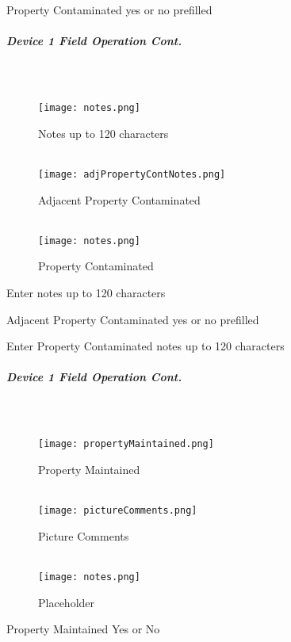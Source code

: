 \documentclass[class=article , crop=false, titlepage, twoside, multi={itemize, figure, verbatim}, float=false]{standalone}
\begin{document}
\noindent Property Contaminated yes or no prefilled\\

\clearpage
\subparagraph*{Device 1 Field Operation Cont.}
\subparagraph*{\\}
\begin{wrapfigure}{r}{0.5\textwidth}
\centering
\texttt{[image: notes.png]}
\caption {Notes up to 120 characters}
\vspace{.2in}
\HRule \\[.4cm] %
\vspace{.2in}
\texttt{[image: adjPropertyContNotes.png]}
\caption{Adjacent Property Contaminated}
\vspace{.2in}
\HRule \\[.4cm] %
\vspace{.2in}
\texttt{[image: notes.png]}
\caption{Property Contaminated}
\end{wrapfigure}
Enter notes up to 120 characters\\
\vspace{3in}

\noindent Adjacent Property Contaminated yes or no prefilled\\
\vspace{3in}

\noindent Enter Property Contaminated notes up to 120 characters\\

\clearpage
\subparagraph*{Device 1 Field Operation Cont.}
\subparagraph*{\\}
\begin{wrapfigure}{r}{0.5\textwidth}
\centering
\texttt{[image: propertyMaintained.png]}
\caption {Property Maintained}
\vspace{.2in}
\HRule \\[.4cm] %
\vspace{.2in}
\texttt{[image: pictureComments.png]}
\caption{Picture Comments}
\vspace{.2in}
\HRule \\[.4cm] %
\vspace{.2in}
\texttt{[image: notes.png]}
\caption{Placeholder}
\end{wrapfigure}
Property Maintained Yes or No\\
\vspace{3in}
\end{document}
